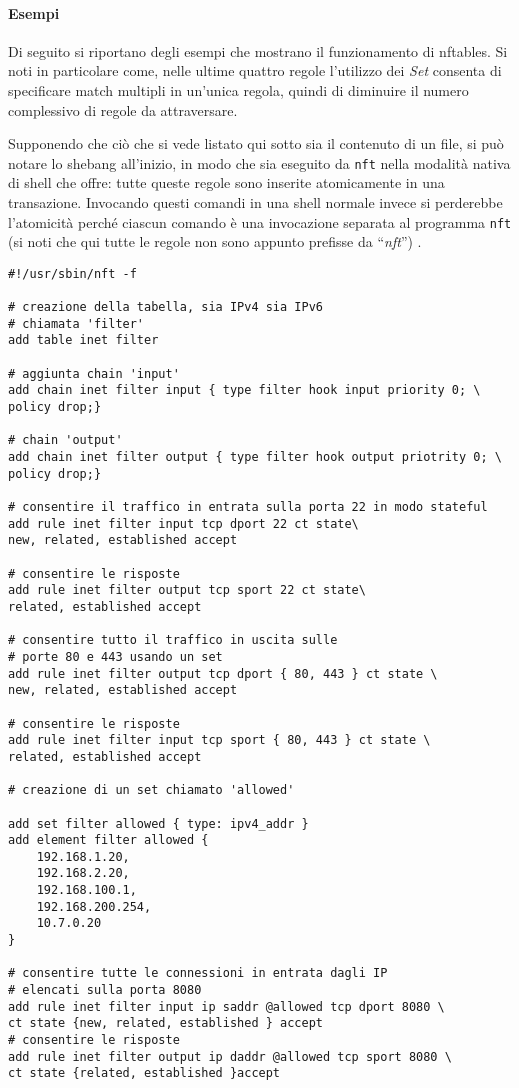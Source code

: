 \paragraph{Esempi}
Di seguito si riportano degli esempi che mostrano il funzionamento di nftables.
Si noti in particolare come, nelle ultime quattro regole l'utilizzo dei \textit{Set}
consenta di specificare match multipli in un'unica regola, quindi di diminuire il
numero complessivo di regole da attraversare.

Supponendo che ciò che si vede listato qui sotto sia il contenuto di un file,
si può notare lo shebang all'inizio, in modo che sia eseguito da \texttt{nft} nella
modalità nativa di shell che offre: tutte queste regole sono inserite atomicamente
in una transazione. Invocando questi comandi in una shell normale invece si
perderebbe l'atomicità perché ciascun comando è una invocazione separata al programma \texttt{nft}
(si noti che qui tutte le regole non sono appunto prefisse da ``\textit{nft}'') \cite{nftables-scripting}.
\begin{verbatim}
#!/usr/sbin/nft -f
	
# creazione della tabella, sia IPv4 sia IPv6
# chiamata 'filter'
add table inet filter
	
# aggiunta chain 'input'
add chain inet filter input { type filter hook input priority 0; \
policy drop;}
	
# chain 'output'
add chain inet filter output { type filter hook output priotrity 0; \
policy drop;}
	
# consentire il traffico in entrata sulla porta 22 in modo stateful
add rule inet filter input tcp dport 22 ct state\
new, related, established accept
	
# consentire le risposte
add rule inet filter output tcp sport 22 ct state\
related, established accept
	
# consentire tutto il traffico in uscita sulle
# porte 80 e 443 usando un set
add rule inet filter output tcp dport { 80, 443 } ct state \
new, related, established accept
	
# consentire le risposte
add rule inet filter input tcp sport { 80, 443 } ct state \
related, established accept
	
# creazione di un set chiamato 'allowed'
	
add set filter allowed { type: ipv4_addr }
add element filter allowed {
	192.168.1.20,
	192.168.2.20,
	192.168.100.1,
	192.168.200.254,
	10.7.0.20
}
	
# consentire tutte le connessioni in entrata dagli IP
# elencati sulla porta 8080
add rule inet filter input ip saddr @allowed tcp dport 8080 \
ct state {new, related, established } accept
# consentire le risposte
add rule inet filter output ip daddr @allowed tcp sport 8080 \
ct state {related, established }accept
\end{verbatim}
